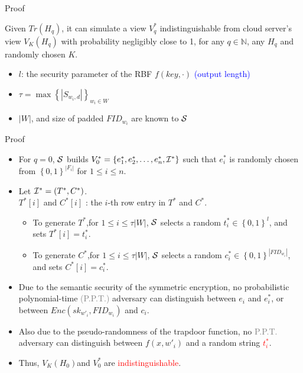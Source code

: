 \documentclass[handout]{beamer}
\begin{document}
\begin{frame}{Proof}
	\begin{definition}
		Given ${Tr({H_q})}$, it can simulate a view $V_q^*$ indistinguishable from cloud server's view ${V_K}({H_q})$ with probability negligibly close to 1, for any $q \in \mathbb{N}$, any ${H_q}$ and randomly chosen $K$.
	\end{definition}
	\begin{itemize}
		\item<2-> $l$: the security parameter of the RBF $f(key, \cdot )$ \textcolor{blue}{(output length)}
		\item<3->  $\tau  = \max {\left\{ {\left| {{S_{{w_i},d}}} \right|} \right\}_{{w_i} \in W}}$
		\item<4-> $\left| W \right|$, and size of padded ${FI{D_{{w_i}}}}$ are known to $\cal S$	
	\end{itemize}
\end{frame}

\begin{frame}{Proof}
	\begin{itemize}
	\item<1-> For $q=0$, $\cal S$ builds $V_0^* = \left\{ {e_1^*,e_2^*, \ldots ,e_n^*,{{\cal I}^*}} \right\}$ such that $e_i^*$ is randomly chosen from ${\left\{ {0,1} \right\}^{\left| {{F_i}} \right|}}$ for $1 \le i \le n$.
	\item<2-> Let ${{\cal I}^*} = ({T^*},{C^*})$.\\
	${T^*}[i]$ and ${C^*}[i]$ : the $i$-th row entry in ${T^*}$ and ${C^*}$.
	\begin{itemize}
		\item<3-> To generate ${T^*}$,for $1 \le i \le \tau \left| W \right|$, $\cal S$ selects a random $t_i^* \in {\left\{ {0,1} \right\}^l}$, and sets ${T^*}[i] = t_i^*$.
		\item<4-> To generate ${C^*}$,for $1 \le i \le \tau \left| W \right|$, $\cal S$ selects a random $c_i^* \in {\left\{ {0,1} \right\}^{\left| {FI{D_{{w_i}}}} \right|}}$, and sets ${C^*}[i] = c_i^*$.
	\end{itemize}
	\item<5-> Due to the semantic security of the symmetric encryption, no probabilistic polynomial-time \textcolor{grey}{(P.P.T.)} adversary can distinguish between ${e_i}$ and $e_i^*$, or between ${Enc(s{k_{w{'_i}}},FI{D_{{w_i}}})}$ and $c_i$.
	\item<6-> Also due to the pseudo-randomness of the trapdoor function, no \textcolor{grey}{P.P.T.} adversary can distinguish between $f(x,w{'_i})$ and a random string \textcolor{red}{$t_i^*$}.
	\item<7-> Thus, ${V_K}({H_0})$and $V_0^*$ are \textcolor{red}{indistinguishable}.
\end{itemize}
\end{frame}
\end{document}
